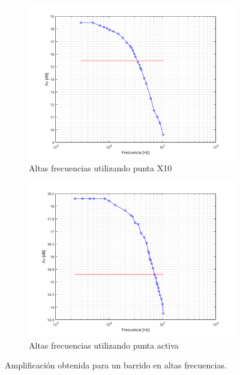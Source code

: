 \documentclass[10pt,spanish,a4paper,notitlepage]{article}
\begin{document}
\begin{figure}[H]
\centering
\begin{subfigure}{.5\textwidth}
  \centering
  \includegraphics[width=1\linewidth]{mediciones/altas_frecuencias_PuntaX10.png}
  \caption{Altas frecuencias utilizando punta X10}
  \label{fig:alta_frec_puntaX10}
\end{subfigure}%
\begin{subfigure}{.5\textwidth}
  \centering
  \includegraphics[width=1\linewidth]{mediciones/altas_frecuencias_PuntaActiva.png}
  \caption{Altas frecuencias utilizando punta activa}
  \label{fig:alta_frec_punta_activa}
\end{subfigure}
\caption{Amplificación obtenida para un barrido en altas frecuencias.}
\label{fig:medicion_alta_frec}
\end{figure}
\end{document}
